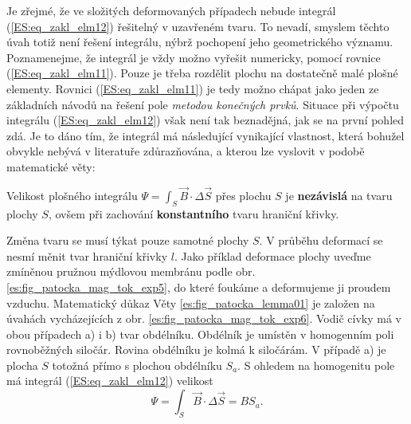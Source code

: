       Je zřejmé, že ve složitých deformovaných případech nebude integrál (\ref{ES:eq_zakl_elm12}) 
      řešitelný v uzavřeném tvaru. To nevadí, smyslem těchto úvah totiž není řešení integrálu, 
      nýbrž pochopení jeho geometrického významu. Poznamenejme, že integrál je vždy možno vyřešit 
      numericky, pomocí rovnice (\ref{ES:eq_zakl_elm11}). Pouze je třeba rozdělit plochu na 
      dostatečně malé plošné elementy. Rovnici (\ref{ES:eq_zakl_elm11}) je tedy možno chápat jako 
      jeden ze základních návodů na řešení pole \emph{metodou konečných prvků}. Situace při výpočtu 
      integrálu (\ref{ES:eq_zakl_elm12}) však není tak beznadějná, jak se na první pohled zdá. Je 
      to dáno tím, že integrál má následující vynikající vlastnost, která bohužel obvykle nebývá v 
      literatuře zdůrazňována, a kterou lze vyslovit v podobě matematické věty:
      \begin{lemma}\label{es:fig_patocka_lemma01}
        Velikost plošného integrálu \(\Psi = \int_S\vec{B}\cdot\Delta \vec{S}\) přes plochu \(S\) 
        je \textbf{nezávislá} na tvaru plochy \(S\), ovšem při zachování \textbf{konstantního} 
        tvaru hraniční křivky.
      \end{lemma}
      
      Změna tvaru se musí týkat pouze samotné plochy \(S\). V průběhu deformací se nesmí měnit tvar 
      hraniční křivky \(l\). Jako příklad deformace plochy uveďme zmíněnou pružnou mýdlovou 
      membránu podle obr. \ref{es:fig_patocka_mag_tok_exp5}, do které foukáme a deformujeme ji 
      proudem vzduchu. Matematický důkaz Věty \ref{es:fig_patocka_lemma01} je založen na úvahách 
      vycházejících z obr. \ref{es:fig_patocka_mag_tok_exp6}. Vodič cívky má v obou případech a) i 
      b) tvar obdélníku. Obdélník je umístěn v homogenním poli rovnoběžných siločár. Rovina 
      obdélníku je kolmá k siločárám. V případě a) je plocha \(S\) totožná přímo s plochou 
      obdélníku \(S_a\). S ohledem na homogenitu pole má integrál (\ref{ES:eq_zakl_elm12}) velikost
      \begin{equation}\label{ES:eq_zakl_elm13}
        \Psi = \int_S\vec{B}\cdot\Delta \vec{S} = BS_a.
      \end{equation}

